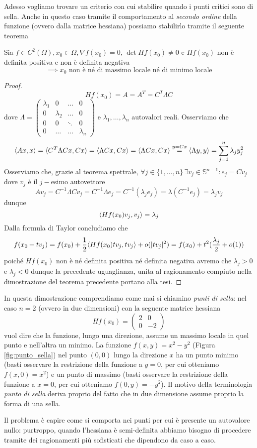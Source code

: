 \documentclass[openany, italian]{book}
\begin{document}
Adesso vogliamo trovare un criterio con cui stabilire quando i punti critici sono di sella. Anche in questo caso tramite il comportamento al \emph{secondo ordine} della funzione (ovvero dalla matrice hessiana) possiamo stabilirlo tramite il seguente teorema
\begin{theorem}
Sia $f \in C^2(\Omega), x_0 \in \Omega, \nabla f(x_0) = 0$, $\det{Hf(x_0)} \neq 0$ e $Hf(x_0)$ non è definita positiva e non è definita negativa
$$
\implies x_0 \text{ non è né di massimo locale né di minimo locale}
$$
\end{theorem}
\begin{proof}
$$
Hf(x_0)=A=A^T=C^T \Lambda C
$$
dove $\Lambda = \begin{pmatrix} \lambda_1 & 0 & \ldots & 0 \\
0 & \lambda_2 & \ldots & 0 \\
0 & 0 & \ddots & 0 \\ 0 & \ldots & \ldots & \lambda_n \end{pmatrix}$ e $\lambda_1, \ldots, \lambda_n$ autovalori reali. Osserviamo che
$$
\langle Ax, x \rangle = \langle C^T \Lambda Cx, Cx \rangle = \langle \Lambda Cx, Cx \rangle =  \langle \Lambda Cx, Cx \rangle \stackrel{y=Cx}{=} \langle \Lambda y, y \rangle = \sum_{j=1}^n \lambda_j y_j^2
$$
Osserviamo che, grazie al teorema spettrale, $\forall j \in \{1, \ldots, n \} \, \exists v_j \in \mathbb{S}^{n-1} : e_j = Cv_j$ dove $v_j$ è il $j-$esimo autovettore
$$
Av_j = C^{-1} \Lambda Cv_j = C^{-1} \Lambda e_j = C^{-1} (\lambda_j e_j) = \lambda (C^{-1} e_j) = \lambda_j v_j
$$
dunque
$$
\langle Hf(x_0)v_j, v_j \rangle = \lambda_j
$$
Dalla formula di Taylor concludiamo che
$$
f(x_0 + tv_j) = f(x_0) + \frac{1}{2} \langle Hf(x_0)tv_j, tv_j \rangle + o(|tv_j|^2) = f(x_0) + t^2(\frac{\lambda_j}{2} + o(1))
$$
poiché $Hf(x_0)$ non è né definita positiva né definita negativa avremo che $\lambda_j > 0$ e $\lambda_j < 0$ dunque la precedente uguaglianza, unita al ragionamento compiuto nella dimostrazione del teorema precedente portano alla tesi.
\end{proof}
\begin{remark}
In questa dimostrazione comprendiamo come mai si chiamino \emph{punti di sella}: nel caso $n=2$ (ovvero in due dimensioni) con la seguente matrice hessiana
$$
Hf(x_0) = \begin{pmatrix}
2 & 0 \\
0 & -2
\end{pmatrix}
$$
vuol dire che la funzione, lungo una direzione, assume un massimo locale in quel punto e nell'altra un minimo. La funzione $f(x,y)=x^2-y^2$ (Figura \ref{fig:punto_sella}) nel punto $(0,0)$ lungo la direzione $x$ ha un punto minimo (basti osservare la restrizione della funzione a $y=0$, per cui otteniamo $f(x, 0)=x^2$) e un punto di massimo (basti osservare la restrizione della funzione a $x=0$, per cui otteniamo $f(0, y) = -y^2$). Il motivo della terminologia \emph{punto di sella} deriva proprio del fatto che in due dimensione assume proprio la forma di una sella.
\end{remark}
Il problema è capire come si comporta nei punti per cui è presente un autovalore nullo: purtroppo, quando l'hessiana è semi-definita abbiamo bisogno di procedere tramite dei ragionamenti più sofisticati che dipendono da caso a caso.
\end{document}
